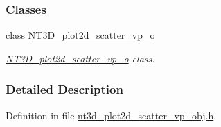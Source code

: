 \subsubsection*{Classes}
\begin{DoxyCompactItemize}
\item 
class \hyperlink{class_n_t3_d__plot2d__scatter__vp__o}{NT3D\_\-plot2d\_\-scatter\_\-vp\_\-o}
\begin{DoxyCompactList}\small\item\em \hyperlink{class_n_t3_d__plot2d__scatter__vp__o}{NT3D\_\-plot2d\_\-scatter\_\-vp\_\-o} class. \item\end{DoxyCompactList}\end{DoxyCompactItemize}


\subsubsection{Detailed Description}


Definition in file \hyperlink{nt3d__plot2d__scatter__vp__obj_8h_source}{nt3d\_\-plot2d\_\-scatter\_\-vp\_\-obj.h}.

